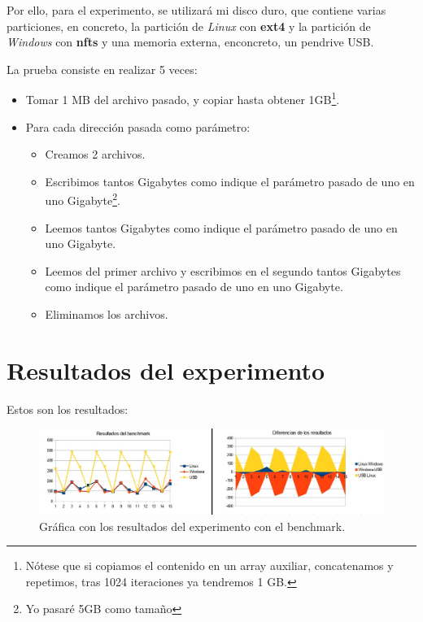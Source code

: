 \documentclass[paper=a4, fontsize=11pt]{scrartcl} %
\numberwithin{equation}{section} %
\numberwithin{figure}{section} %
\numberwithin{table}{section} %
\begin{document}
		Por ello, para el experimento, se utilizará mi disco duro, que contiene varias particiones,
		en concreto, la partición de \textit{Linux} con \textbf{ext4} y la partición de
		\textit{Windows} con \textbf{nfts} y una memoria externa, enconcreto, un pendrive USB.
		
		La prueba consiste en realizar 5 veces:
		
		\begin{itemize}
			\item Tomar 1 MB del archivo pasado, y copiar hasta obtener 1GB\footnote{Nótese que si
			copiamos el contenido en un array auxiliar, concatenamos y repetimos, tras 1024
			iteraciones ya tendremos 1 GB.}.
			
			\item Para cada dirección pasada como parámetro:
				\begin{itemize}
					\item Creamos 2 archivos.
			
					\item Escribimos tantos Gigabytes como indique el parámetro pasado de uno en
					uno Gigabyte\footnote{Yo pasaré 5GB como tamaño}.
			
					\item Leemos tantos Gigabytes como indique el parámetro pasado de uno en uno
					Gigabyte.
			
					\item Leemos del primer archivo y escribimos en el segundo tantos Gigabytes
					como indique el parámetro pasado de uno en uno Gigabyte.
								
					\item Eliminamos los archivos.
				\end{itemize}
		\end{itemize}
		
	\section{Resultados del experimento}
		Estos son los resultados:
		
		
		
		\begin{figure}[H]
			\centering
			\includegraphics[width=15cm]{Graficas.jpg}
			\caption{Gráfica con los resultados del experimento con el benchmark.}
			\label{fig:graph}	
		\end{figure}
		
\end{document}
